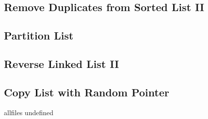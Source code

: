 \documentclass{article}
\begin{document}
\begin{CJK}{UTF8}{gbsn}
\subsection{Remove Duplicates from Sorted List II}

\subsection{Partition List}

\subsection{Reverse Linked List II}

\subsection{Copy List with Random Pointer}


\fi

\ifx allfiles undefined
\end{CJK}
\end{document}
